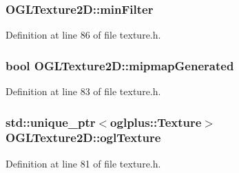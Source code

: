 \hypertarget{class_o_g_l_texture2_d_a064aa8eb5f6a5bc10300c0a68fd95c10}{}
\subsubsection[{min\+Filter}]{ O\+G\+L\+Texture2\+D\+::min\+Filter\hspace{0.3cm}{\ttfamily [protected]}}\label{class_o_g_l_texture2_d_a064aa8eb5f6a5bc10300c0a68fd95c10}


Definition at line 86 of file texture.\+h.

\hypertarget{class_o_g_l_texture2_d_ad0f35d77499d646cee162e9a3213c243}{}
\subsubsection[{mipmap\+Generated}]{\setlength{\rightskip}{0pt plus 5cm}bool O\+G\+L\+Texture2\+D\+::mipmap\+Generated\hspace{0.3cm}{\ttfamily [protected]}}\label{class_o_g_l_texture2_d_ad0f35d77499d646cee162e9a3213c243}


Definition at line 83 of file texture.\+h.

\hypertarget{class_o_g_l_texture2_d_a81c34266417bac598a6dcf78655e3657}{}
\subsubsection[{ogl\+Texture}]{\setlength{\rightskip}{0pt plus 5cm}std\+::unique\+\_\+ptr$<$oglplus\+::\+Texture$>$ O\+G\+L\+Texture2\+D\+::ogl\+Texture\hspace{0.3cm}{\ttfamily [protected]}}\label{class_o_g_l_texture2_d_a81c34266417bac598a6dcf78655e3657}


Definition at line 81 of file texture.\+h.

\hypertarget{class_o_g_l_texture2_d_a986498afd6ef99ef2bfc05b62a4c5b8b}{}
